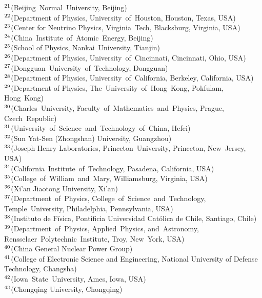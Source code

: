{$^{21}$(Beijing~Normal~University, Beijing) \\ 
$^{22}$(Department of Physics, University~of~Houston, Houston, Texas, USA) \\ 
$^{23}$(Center for Neutrino Physics, Virginia~Tech, Blacksburg, Virginia, USA) \\ 
$^{24}$(China~Institute~of~Atomic~Energy, Beijing) \\ 
$^{25}$(School of Physics, Nankai~University, Tianjin) \\ 
$^{26}$(Department of Physics, University~of~Cincinnati, Cincinnati, Ohio, USA) \\ 
$^{27}$(Dongguan~University~of~Technology, Dongguan) \\ 
$^{28}$(Department of Physics, University~of~California, Berkeley, California, USA) \\ 
$^{29}$(Department of Physics, The~University~of~Hong~Kong, Pokfulam, Hong~Kong) \\ 
$^{30}$(Charles~University, Faculty~of~Mathematics~and~Physics, Prague, Czech~Republic) \\ 
$^{31}$(University~of~Science~and~Technology~of~China, Hefei) \\ 
$^{32}$(Sun Yat-Sen (Zhongshan) University, Guangzhou) \\ 
$^{33}$(Joseph Henry Laboratories, Princeton~University, Princeton, New~Jersey, USA) \\ 
$^{34}$(California~Institute~of~Technology, Pasadena, California, USA) \\ 
$^{35}$(College~of~William~and~Mary, Williamsburg, Virginia, USA) \\ 
$^{36}$(Xi'an Jiaotong University, Xi'an) \\ 
$^{37}$(Department~of~Physics, College~of~Science~and~Technology, Temple~University, Philadelphia, Pennsylvania, USA) \\ 
$^{38}$(Instituto de F\'isica, Pontificia Universidad Cat\'olica de Chile, Santiago, Chile) \\ 
$^{39}$(Department~of~Physics, Applied~Physics, and~Astronomy, Rensselaer~Polytechnic~Institute, Troy, New~York, USA) \\ 
$^{40}$(China General Nuclear Power Group) \\ 
$^{41}$(College of Electronic Science and Engineering, National University of Defense Technology, Changsha) \\ 
$^{42}$(Iowa~State~University, Ames, Iowa, USA) \\ 
$^{43}$(Chongqing University, Chongqing) \\ 
} 
